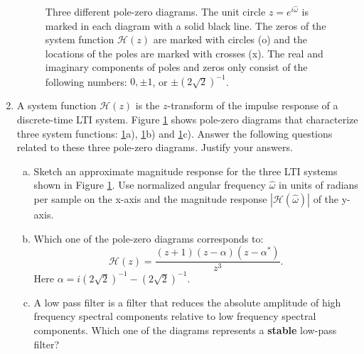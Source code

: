 \begin{enumerate}
\begin{figure}[!h]
\begin{center}
\begin{minipage}{0.32\textwidth}
\end{minipage}
\end{center}
\caption{Three different pole-zero diagrams. The unit circle $z=e^{i\hat{\omega}}$ is marked in each diagram with a solid black line. The zeros of the system function $\mathcal{H}(z)$ are marked with circles (o) and the locations of the poles are marked with crosses (x). The real and imaginary components of poles and zeros only consist of the following numbers: $0, \pm 1$, or $\pm (2\sqrt{2})^{-1}$.}
\label{fig:exzone}
\end{figure}

\item A system function $\mathcal{H}(z)$ is the $z$-transform of the impulse response of a discrete-time LTI system. Figure \ref{fig:exzone} shows pole-zero diagrams that characterize three system functions: \ref{fig:exzone}a), \ref{fig:exzone}b) and \ref{fig:exzone}c). Answer the following questions related to these three pole-zero diagrams. Justify your answers.

\begin{enumerate}[a)]

\item Sketch an approximate magnitude response for the three LTI systems shown
in Figure \ref{fig:exzone}. Use normalized angular frequency $\hat{\omega}$
in units of radians per sample on the x-axis and the magnitude
response $|\mathcal{H}(\hat{\omega})|$ of the y-axis.


\item  Which one of the pole-zero diagrams corresponds to:
\begin{equation}
\mathcal{H}(z) = \frac{(z+1)(z-\alpha)(z-\alpha^*)}{z^3}.
\end{equation}
Here $\alpha=i (2\sqrt{2})^{-1} - (2\sqrt{2})^{-1}$.


\item A low pass filter is a filter that reduces the absolute
amplitude of high frequency spectral components relative to low
frequency spectral components. Which one of the diagrams represents
a \textbf{stable} low-pass filter?


\end{enumerate}
\end{enumerate}

